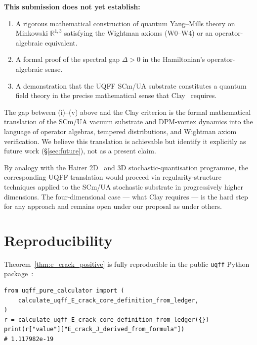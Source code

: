 \documentclass[11pt,a4paper,onecolumn]{article}
\theoremstyle{plain}
\theoremstyle{definition}
\theoremstyle{remark}
\begin{document}
\medskip
\noindent\textbf{This submission does not yet establish:}
\begin{enumerate}
\item A rigorous mathematical construction of quantum Yang--Mills
  theory on Minkowski $\mathbb{R}^{1,3}$ satisfying the Wightman
  axioms (W0--W4) or an operator-algebraic equivalent.
\item A formal proof of the spectral gap $\Delta > 0$ in the
  Hamiltonian's operator-algebraic sense.
\item A demonstration that the UQFF SCm/UA substrate constitutes a
  quantum field theory in the precise mathematical sense that
  Clay~\cite{jaffe2000} requires.
\end{enumerate}

\medskip
\noindent
The gap between (i)--(v) above and the Clay criterion is the formal
mathematical translation of the SCm/UA vacuum substrate and DPM-vortex
dynamics into the language of operator algebras, tempered distributions,
and Wightman axiom verification. We believe this translation is
achievable but identify it explicitly as future work
(\S\ref{sec:future}), not as a present claim.

By analogy with the Hairer 2D~\cite{hairer2024} and 3D
stochastic-quantisation programme, the corresponding UQFF translation
would proceed via regularity-structure techniques applied to the
SCm/UA stochastic substrate in progressively higher dimensions.
The four-dimensional case --- what Clay requires --- is the hard step
for any approach and remains open under our proposal as under others.

\section{Reproducibility}\label{sec:reproducibility}

Theorem~\ref{thm:e_crack_positive} is fully reproducible in the public
\texttt{uqff} Python package~\cite{murphy2026uqff}:

\begin{lstlisting}
from uqff_pure_calculator import (
    calculate_uqff_E_crack_core_definition_from_ledger,
)
r = calculate_uqff_E_crack_core_definition_from_ledger({})
print(r["value"]["E_crack_J_derived_from_formula"])
# 1.117982e-19
\end{lstlisting}
\end{document}
